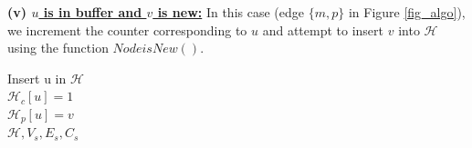 




 
\noindent\textbf{(v) \underline{$u$ is in buffer and $v$ is new:}} In this case (edge $\{m,p\}$ in Figure \ref{fig_algo}), we increment the counter corresponding to $u$ and attempt to insert $v$ into $\mathcal{H}$ using the function $NodeisNew()$. 

\begin{function7}[!ht]
 \caption{\small $NodeisNew(u,v,\mathcal{H},V_s,E_s,C_s)$}
 \label{nodenew}
Insert u in $\mathcal{H}$ \\
$\mathcal{H}_c[u] = 1$\\
$\mathcal{H}_p[u] = v$ \\

\Return $\mathcal{H},V_s,E_s,C_s$
\end{function7}

